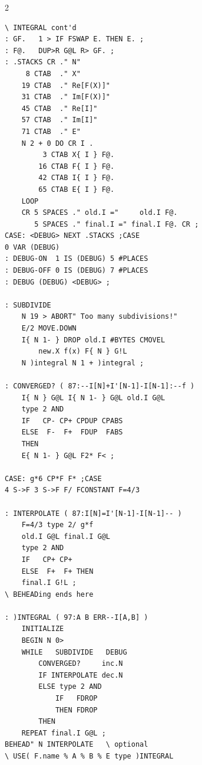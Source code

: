 \begin{figure}[H]
\begin{multicols}{2}
    \scriptsize
    \begin{lstlisting}
\ INTEGRAL cont'd
: GF.   1 > IF FSWAP E. THEN E. ;
: F@.   DUP>R G@L R> GF. ;
: .STACKS CR ." N"
     8 CTAB  ." X"
    19 CTAB  ." Re[F(X)]"
    31 CTAB  ." Im[F(X)]"
    45 CTAB  ." Re[I]"
    57 CTAB  ." Im[I]"
    71 CTAB  ." E"
    N 2 + 0 DO CR I .
         3 CTAB X{ I } F@.
        16 CTAB F{ I } F@.
        42 CTAB I{ I } F@.
        65 CTAB E{ I } F@.
    LOOP
    CR 5 SPACES ." old.I ="     old.I F@.
       5 SPACES ." final.I =" final.I F@. CR ;
CASE: <DEBUG> NEXT .STACKS ;CASE
0 VAR (DEBUG)
: DEBUG-ON  1 IS (DEBUG) 5 #PLACES
: DEBUG-OFF 0 IS (DEBUG) 7 #PLACES
: DEBUG (DEBUG) <DEBUG> ;

: SUBDIVIDE
    N 19 > ABORT" Too many subdivisions!"
    E/2 MOVE.DOWN
    I{ N 1- } DROP old.I #BYTES CMOVEL
        new.X f(x) F{ N } G!L
    N )integral N 1 + )integral ;

: CONVERGED? ( 87:--I[N]+I'[N-1]-I[N-1]:--f )
    I{ N } G@L I{ N 1- } G@L old.I G@L
    type 2 AND
    IF   CP- CP+ CPDUP CPABS
    ELSE  F-  F+  FDUP  FABS
    THEN
    E{ N 1- } G@L F2* F< ;

CASE: g*6 CP*F F* ;CASE
4 S->F 3 S->F F/ FCONSTANT F=4/3

: INTERPOLATE ( 87:I[N]=I'[N-1]-I[N-1]-- )
    F=4/3 type 2/ g*f
    old.I G@L final.I G@L
    type 2 AND
    IF   CP+ CP+
    ELSE  F+  F+ THEN
    final.I G!L ;
\ BEHEADing ends here

: )INTEGRAL ( 97:A B ERR--I[A,B] )
    INITIALIZE
    BEGIN N 0>
    WHILE   SUBDIVIDE   DEBUG
        CONVERGED?     inc.N
        IF INTERPOLATE dec.N
        ELSE type 2 AND
            IF   FDROP
            THEN FDROP
        THEN
    REPEAT final.I G@L ;
BEHEAD" N INTERPOLATE   \ optional
\ USE( F.name % A % B % E type )INTEGRAL
    \end{lstlisting}
\end{multicols}
\end{figure}